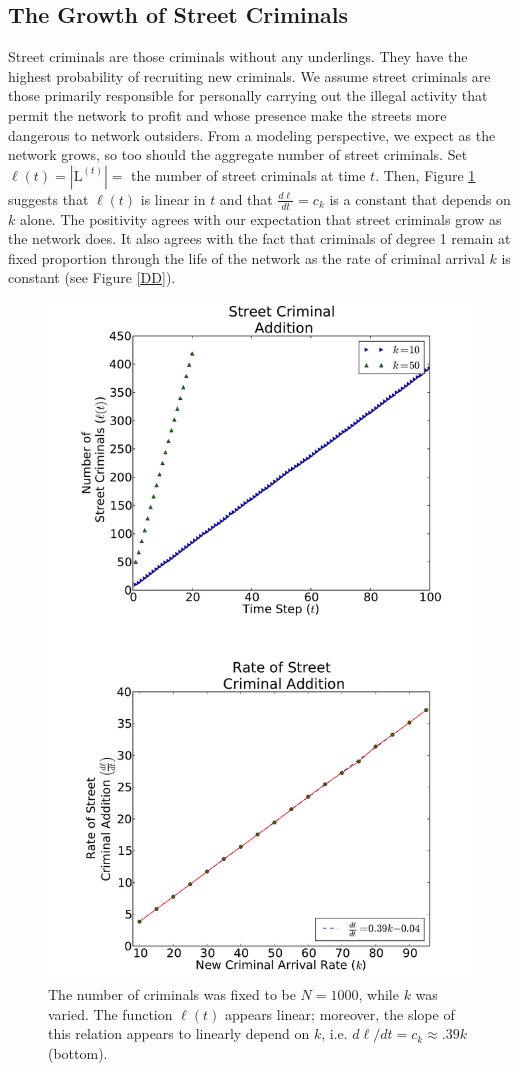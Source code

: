 \documentclass[%
 reprint,
 amsmath,amssymb,
 aps,
]{revtex4-1}
\renewcommand{\L}{\mathrm{L}}
\renewcommand{\l}{\ell}
\theoremstyle{plain}
\theoremstyle{definition}
\begin{document}
\subsection*{The Growth of Street Criminals}
Street criminals are those criminals without any underlings.  They have the highest probability of recruiting new criminals.  We assume street criminals are those primarily responsible for personally carrying out the illegal activity that permit the network to profit and whose presence make the streets more dangerous to network outsiders.  From a modeling perspective, we expect as the network grows, so too should the aggregate number of street criminals.  Set $\l(t) = |\L^{(t)}| =$ the number of street criminals at time $t$.  Then, Figure \ref{leaf} suggests that $\l(t)$ is linear in $t$ and that $\frac{d \l}{d t} = c_k$ is a constant that depends on $k$ alone.  The positivity agrees with our expectation that street criminals grow as the network does.  It also agrees with the fact that criminals of degree 1 remain at fixed proportion through the life of the network as the rate of criminal arrival $k$ is constant (see Figure \ref{DD}).

 \begin{figure}
\includegraphics[height=12 cm]{leafstats.pdf}
\caption{The number of criminals was fixed to be $N = 1000$, while $k$ was varied.  The function $\l(t)$ appears linear; moreover, the slope of this relation appears to linearly depend on $k$, i.e. $d \l/d t = c_k\approx .39k$ (bottom).}
\label{leaf}
\end{figure}
\end{document}
